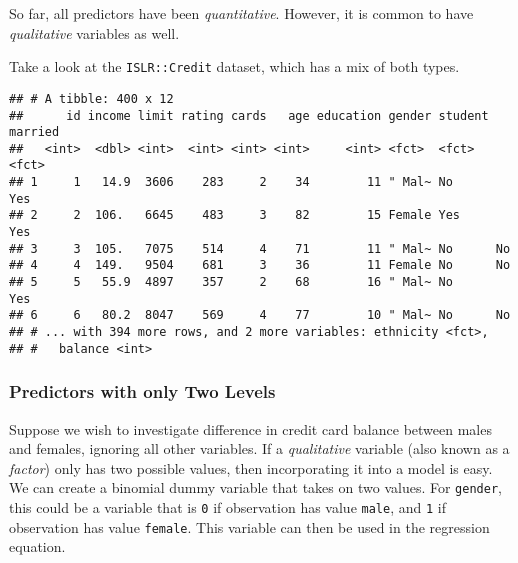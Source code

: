 \documentclass[]{book}
\newenvironment{Shaded}{\begin{snugshade}}{\end{snugshade}}
\newcommand{\KeywordTok}[1]{\textcolor[rgb]{0.13,0.29,0.53}{\textbf{#1}}}
\newcommand{\NormalTok}[1]{#1}
\newcommand{\OperatorTok}[1]{\textcolor[rgb]{0.81,0.36,0.00}{\textbf{#1}}}
\newcommand{\StringTok}[1]{\textcolor[rgb]{0.31,0.60,0.02}{#1}}
\begin{document}
So far, all predictors have been \emph{quantitative}. However, it is common to have \emph{qualitative} variables as well.

Take a look at the \texttt{ISLR::Credit} dataset, which has a mix of both types.

\begin{Shaded}
\end{Shaded}

\begin{verbatim}
## # A tibble: 400 x 12
##      id income limit rating cards   age education gender student married
##   <int>  <dbl> <int>  <int> <int> <int>     <int> <fct>  <fct>   <fct>  
## 1     1   14.9  3606    283     2    34        11 " Mal~ No      Yes    
## 2     2  106.   6645    483     3    82        15 Female Yes     Yes    
## 3     3  105.   7075    514     4    71        11 " Mal~ No      No     
## 4     4  149.   9504    681     3    36        11 Female No      No     
## 5     5   55.9  4897    357     2    68        16 " Mal~ No      Yes    
## 6     6   80.2  8047    569     4    77        10 " Mal~ No      No     
## # ... with 394 more rows, and 2 more variables: ethnicity <fct>,
## #   balance <int>
\end{verbatim}

\hypertarget{predictors-with-only-two-levels}{%
\subsubsection{Predictors with only Two Levels}\label{predictors-with-only-two-levels}}

Suppose we wish to investigate difference in credit card balance between males and females, ignoring all other variables. If a \emph{qualitative} variable (also known as a \emph{factor}) only has two possible values, then incorporating it into a model is easy. We can create a binomial dummy variable that takes on two values. For \texttt{gender}, this could be a variable that is \texttt{0} if observation has value \texttt{male}, and \texttt{1} if observation has value \texttt{female}. This variable can then be used in the regression equation.
\end{document}
